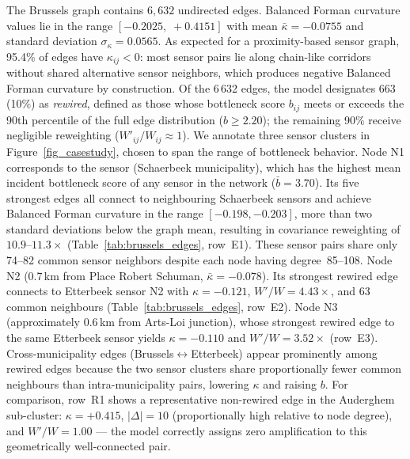 \documentclass{article}
\theoremstyle{plain}
\theoremstyle{definition}
\theoremstyle{remark}
\begin{document}
The Brussels graph contains $6,632$ undirected edges. Balanced Forman curvature values lie in the range $[-0.2025,\; +0.4151]$ with mean $\bar{\kappa}{=}{-0.0755}$ and standard deviation $\sigma_\kappa{=}0.0565$. As expected for a proximity-based sensor graph, 95.4\% of edges have $\kappa_{ij}{<}0$: most sensor pairs lie along chain-like corridors without shared alternative sensor neighbors, which produces negative Balanced Forman curvature by construction. Of the 6\,632 edges, the model designates $663$ (10\%) as \emph{rewired}, defined as those whose bottleneck score $b_{ij}$ meets or exceeds the 90th percentile of the full edge distribution ($b \geq 2.20$); the remaining 90\% receive negligible reweighting ($W'_{ij}/W_{ij} \approx 1$). We annotate three sensor clusters in Figure~\ref{fig_casestudy}, chosen to span the range of bottleneck behavior. Node N1 corresponds to the sensor (Schaerbeek municipality), which has the highest mean incident bottleneck score of any sensor in the network ($\bar{b}{=}3.70$). Its five strongest edges all connect to neighbouring Schaerbeek sensors and achieve Balanced Forman curvature in the range $[-0.198, -0.203]$, more than two standard deviations below the graph mean, resulting in covariance reweighting of $10.9$–$11.3\times$ (Table~\ref{tab:brussels_edges}, row~E1). These sensor pairs share only 74–82 common sensor neighbors despite each node having degree~85–108. Node N2 (0.7\,km from Place Robert Schuman, $\bar{\kappa}{=}{-0.078}$). Its strongest rewired edge connects to Etterbeek sensor N2 with $\kappa{=}{-0.121}$, $W'/W{=}4.43\times$, and 63 common neighbours (Table~\ref{tab:brussels_edges}, row~E2). {Node N3} (approximately 0.6\,km from Arts-Loi junction), whose strongest rewired edge to the same Etterbeek sensor yields $\kappa{=}{-0.110}$ and $W'/W{=}3.52\times$ (row~E3). Cross-municipality edges (Brussels$\leftrightarrow$Etterbeek) appear prominently among rewired edges because the two sensor clusters share proportionally fewer common neighbours than intra-municipality pairs, lowering $\kappa$ and raising $b$. For comparison, row~R1 shows a representative non-rewired edge in the Auderghem sub-cluster: $\kappa{=}+0.415$, $|\Delta|{=}10$ (proportionally high relative to node degree), and $W'/W{=}1.00$ — the model correctly assigns zero amplification to this geometrically well-connected pair.
\end{document}
